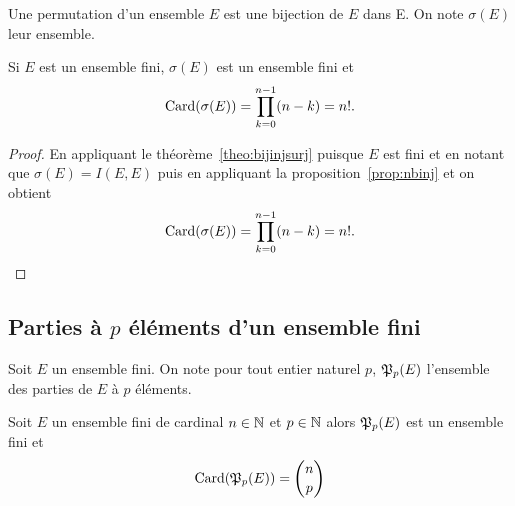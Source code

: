 \begin{defdef}
  Une permutation d'un ensemble \(E\) est une bijection de \(E\) dans E. On note
  \(\sigma(E)\) leur ensemble.
\end{defdef}

\begin{prop}
  Si \(E\) est un ensemble fini, \(\sigma(E)\) est un ensemble fini et
  \begin{equation}
    \operatorname{Card}(\sigma(E)) = \prod_{k = 0}^{n - 1}(n - k) = n!.
  \end{equation}
\end{prop}

\begin{proof}
  En appliquant le théorème~\ref{theo:bijinjsurj} puisque \(E\) est fini et en
  notant que \(\sigma(E) = I(E, E)\) puis en appliquant la
  proposition~\ref{prop:nbinj} et on obtient
  \begin{equation}
    \operatorname{Card}(\sigma(E)) = \prod_{k = 0}^{n - 1}(n - k) = n!.
  \end{equation}
\end{proof}

\subsection{Parties à \(p\) éléments d'un ensemble fini}

Soit \(E\) un ensemble fini. On note pour tout entier naturel \(p\),
\(\mathfrak{P}_p(E)\) l'ensemble des parties de \(E\) à \(p\) éléments.

\begin{prop}
  \label{prop:ppartiesfinies}
  Soit \(E\) un ensemble fini de cardinal \(n\in \mathbb{N}\) et \(p \in \mathbb{N}\) alors
  \(\mathfrak{P}_p(E)\) est un ensemble fini et
  \begin{equation}
    \operatorname{Card}(\mathfrak{P}_p(E)) = \binom{n}{p}
  \end{equation}
\end{prop}

